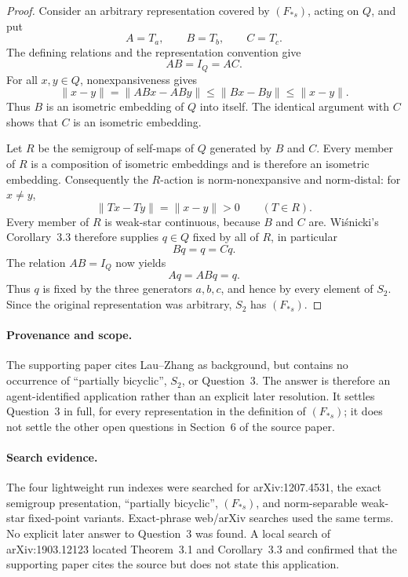 \documentclass[11pt]{article}
\begin{document}
\begin{proof}
Consider an arbitrary representation covered by \((F_{*s})\), acting on
\(Q\), and put
\[
 A=T_a,\qquad B=T_b,\qquad C=T_c.
\]
The defining relations and the representation convention give
\[
 AB=I_Q=AC.
\]
For all \(x,y\in Q\), nonexpansiveness gives
\[
 \|x-y\|=\|ABx-ABy\|
 \leq \|Bx-By\|\leq \|x-y\|.
\]
Thus \(B\) is an isometric embedding of \(Q\) into itself.  The identical
argument with \(C\) shows that \(C\) is an isometric embedding.

Let \(R\) be the semigroup of self-maps of \(Q\) generated by \(B\) and
\(C\). Every member of \(R\) is a composition of isometric embeddings and is
therefore an isometric embedding.  Consequently the \(R\)-action is
norm-nonexpansive and norm-distal: for \(x\ne y\),
\[
 \|Tx-Ty\|=\|x-y\|>0\qquad(T\in R).
\]
Every member of \(R\) is weak-star continuous, because \(B\) and \(C\) are.
Wiśnicki's Corollary~3.3 therefore supplies \(q\in Q\) fixed by all of
\(R\), in particular
\[
 Bq=q=Cq.
\]
The relation \(AB=I_Q\) now yields
\[
 Aq=ABq=q.
\]
Thus \(q\) is fixed by the three generators \(a,b,c\), and hence by every
element of \(S_2\).  Since the original representation was arbitrary,
\(S_2\) has \((F_{*s})\).
\end{proof}

\paragraph{Provenance and scope.}
The supporting paper cites Lau--Zhang as background, but contains no occurrence
of ``partially bicyclic'', \(S_2\), or Question~3.  The answer is therefore an
agent-identified application rather than an explicit later resolution.  It
settles Question~3 in full, for every representation in the definition of
\((F_{*s})\); it does not settle the other open questions in Section~6 of the
source paper.

\paragraph{Search evidence.}
The four lightweight run indexes were searched for arXiv:1207.4531, the exact
semigroup presentation, ``partially bicyclic'', \((F_{*s})\), and
norm-separable weak-star fixed-point variants.  Exact-phrase web/arXiv searches
used the same terms.  No explicit later answer to Question~3 was found.  A
local search of arXiv:1903.12123 located Theorem~3.1 and Corollary~3.3 and
confirmed that the supporting paper cites the source but does not state this
application.
\end{document}
